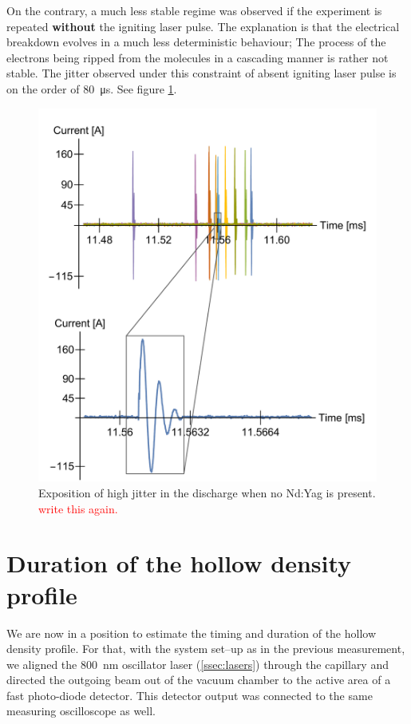 \documentclass[../main.tex]{subfiles}
\begin{document}
On the contrary, a much less stable regime was observed if the experiment is repeated \textbf{without} the igniting laser pulse. The explanation is that the electrical breakdown evolves in a much less deterministic behaviour; The process of the electrons being ripped from the molecules in a cascading manner is rather not stable. The jitter observed under this constraint of absent igniting laser pulse is on the order of \SI{80}{\us}. See figure \ref{fig:multiple}.
\begin{figure}
    \centering
    \includegraphics[width=\textwidth]{figures/jitter/multiple.pdf}
    \caption{Exposition of high jitter in the discharge when no Nd:Yag is present. \textcolor{red}{write this again.}}
    \label{fig:multiple}
\end{figure}

\section{Duration of the hollow density profile}\label{sec:duration-of-guiding}
We are now in a position to estimate the timing and duration of the hollow density profile. For that, with the system set--up as in the previous measurement, we aligned the \SI{800}{\nm} oscillator laser (\ref{ssec:lasers}) through the capillary and directed the outgoing beam out of the vacuum chamber to the active area of a fast photo-diode detector. This detector output was connected to the same measuring oscilloscope as well.
\end{document}

